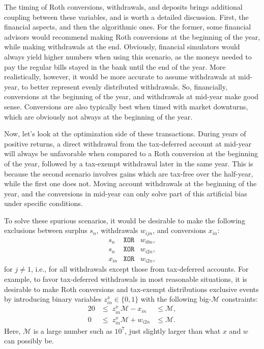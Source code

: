 \documentclass{report}[fleqn,11pt]
\begin{document}
	The timing of Roth conversions, withdrawals, and deposits brings
	additional coupling between these variables, and is worth a detailed discussion.
	First, the financial aspects, and then the algorithmic ones.
	For the former, some financial advisors would recommend making Roth
	conversions at the beginning of the year, while making withdrawals
	at the end. Obviously, financial simulators would always yield higher numbers
	when using this scenario, as the moneys needed to pay the regular bills 
	stayed in the bank until the end of the year. More realistically,
	however, it would be more accurate to assume withdrawals at mid-year,
	to better represent evenly distributed withdrawals. So, financially,
	conversions at the beginning of the year, and withdrawals at mid-year
	make good sense. Conversions are also typically best when
	timed with market downturns, which are obviously not always at the
	beginning of the year.

	Now, let's look at the optimization side of these transactions.
	During years of positive returns,
	a direct withdrawal from the tax-deferred account at mid-year will always
	be unfavorable when compared to a Roth conversion
	at the beginning of the year, followed
	by a tax-exempt withdrawal later in the same year.
	This is because the second
	scenario involves gains which are tax-free over the half-year, while
	the first one does not. Moving account withdrawals at the beginning
	of the year, and the conversions in mid-year can only solve part of this artificial bias
	under specific conditions.

	To solve these spurious scenarios, it would be desirable to make the following exclusions
	between surplus $s_n$, withdrawals $w_{ijn}$, and conversions $x_{in}$:
	\begin{eqnarray*}
		s_n &\texttt{XOR} & w_{i0n}, \\
		s_n &\texttt{XOR} & w_{i2n}, \\
		x_{in} &\texttt{XOR} & w_{i2n},
	\end{eqnarray*}
	for $j \neq 1$, i.e., for all withdrawals except those from tax-deferred accounts.
	For example, to favor tax-deferred withdrawals in most reasonable situations,
	it is desirable to make Roth conversions and tax-exempt distributions exclusive events
	by introducing binary variables $z_{in}^x \in \{0, 1\}$ with the following big-$\mathcal{M}$
	constraints:
	\begin{alignat}{2}
		\label{Eq:Binary}
		0 & \le \; z_{in}^x \mathcal{M} - x_{in} &\le \mathcal{M}, \nonumber \\
		0 & \le \; z_{in}^x \mathcal{M} + w_{i2n} &\le \mathcal{M}.
	\end{alignat}
	Here, $\mathcal{M}$ is a large number such as $10^7$, just slightly
	larger than what $x$ and $w$ can possibly be.
\end{document}
